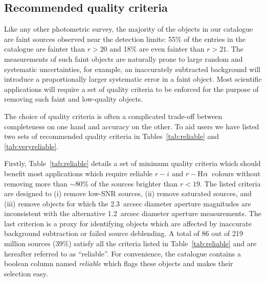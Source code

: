 \documentclass[useAMS,usenatbib]{mn2e}
\def\ha{\mbox{H$\rm \alpha$}}
\begin{document}
\subsection{Recommended quality criteria}
\label{sec:qualitycriteria}

Like any other photometric survey,
the majority of the objects in our catalogue
are faint sources observed near the detection limits:
55\% of the entries in the catalogue
are fainter than $r > 20$
and 18\% are even fainter than $r > 21$.
The measurements of such faint objects
are naturally prone to large
random and systematic uncertainties,
for example, an inaccurately subtracted background
will introduce a proportionally larger systematic error
in a faint object.
Most scientific applications will require a set of
quality criteria to be enforced for the purpose
of removing such faint and low-quality objects.

The choice of quality criteria is often a complicated
trade-off between completeness on one hand
and accuracy on the other.
To aid users we have listed two sets of
recommended quality criteria 
in Tables~\ref{tab:reliable} and \ref{tab:veryreliable}.

Firstly, Table~\ref{tab:reliable} details
a set of minimum quality criteria
which should benefit most applications
which require reliable $r-i$ and $r-$\ha\ colours
without removing more than $\sim$80\%
of the sources brighter than $r < 19$.
The listed criteria are designed to 
(i) remove low-SNR sources, 
(ii) remove saturated sources,
and (iii) remove objects for which the 2.3~arcsec diameter
aperture magnitudes are inconsistent 
with the alternative 1.2~arcsec diameter aperture measurements.
The last criterion is a proxy
for identifying objects which are affected
by inaccurate background subtraction
or failed source deblending.
A total of 86 out of 219 million sources 
(39\%) satisfy all the criteria listed in Table~\ref{tab:reliable}
and are hereafter referred to as ``reliable''.
For convenience, the catalogue contains a boolean column
named \emph{reliable} which flags these objects
and makes their selection easy.
\end{document}
